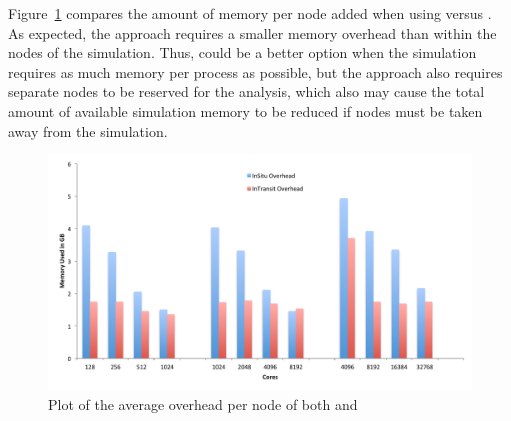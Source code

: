 Figure~\ref{fig:MemoryCompare} compares the amount of memory per node added
when using \insitu versus \intransit.  As expected, the \intransit approach
requires a smaller memory overhead than \insitu within the nodes of the
simulation.  Thus, \intransit could be a better option when the simulation
requires as much memory per process as possible, but the \intransit
approach also requires separate nodes to be reserved for the analysis,
which also may cause the total amount of available simulation memory to be
reduced if nodes must be taken away from the simulation.

\begin{figure}[htb]
  \centering
  \includegraphics[width=\linewidth]{figures/MemoryUsageCompare}
  \caption{Plot of the average overhead per node of both \insitu and \intransit}
  \label{fig:MemoryCompare}
\end{figure}


